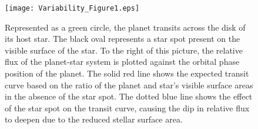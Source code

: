 \documentclass[manuscript]{aastex}
\begin{document}





\begin{figure}

\texttt{[image: Variability\_Figure1.eps]}
\caption{Represented as a green circle, the planet transits across the  disk of its host star. The black oval represents a star spot present on the visible surface of the star. To the right of this picture, the relative flux of the planet-star system is plotted against the orbital phase position of the planet. The solid red line shows the expected transit curve based on the ratio of the planet and star's visible surface areas in the absence of the star spot. The dotted blue line shows the effect of the star spot on the transit curve, causing the dip in relative flux to deepen due to the reduced stellar surface area. \label{fig:Variability_Figure1}}

\end{figure}
\end{document}
